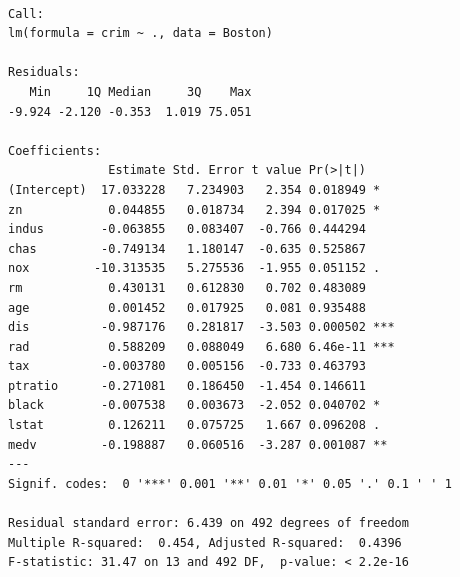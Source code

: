 \documentclass[
]{article}
\newenvironment{Shaded}{\begin{snugshade}}{\end{snugshade}}
\newcommand{\AttributeTok}[1]{\textcolor[rgb]{0.40,0.45,0.13}{#1}}
\newcommand{\DecValTok}[1]{\textcolor[rgb]{0.68,0.00,0.00}{#1}}
\newcommand{\FloatTok}[1]{\textcolor[rgb]{0.68,0.00,0.00}{#1}}
\newcommand{\FunctionTok}[1]{\textcolor[rgb]{0.28,0.35,0.67}{#1}}
\newcommand{\NormalTok}[1]{\textcolor[rgb]{0.00,0.23,0.31}{#1}}
\newcommand{\OtherTok}[1]{\textcolor[rgb]{0.00,0.23,0.31}{#1}}
\newcommand{\SpecialCharTok}[1]{\textcolor[rgb]{0.37,0.37,0.37}{#1}}
\newcommand{\StringTok}[1]{\textcolor[rgb]{0.13,0.47,0.30}{#1}}
\begin{document}
\begin{verbatim}

Call:
lm(formula = crim ~ ., data = Boston)

Residuals:
   Min     1Q Median     3Q    Max 
-9.924 -2.120 -0.353  1.019 75.051 

Coefficients:
              Estimate Std. Error t value Pr(>|t|)    
(Intercept)  17.033228   7.234903   2.354 0.018949 *  
zn            0.044855   0.018734   2.394 0.017025 *  
indus        -0.063855   0.083407  -0.766 0.444294    
chas         -0.749134   1.180147  -0.635 0.525867    
nox         -10.313535   5.275536  -1.955 0.051152 .  
rm            0.430131   0.612830   0.702 0.483089    
age           0.001452   0.017925   0.081 0.935488    
dis          -0.987176   0.281817  -3.503 0.000502 ***
rad           0.588209   0.088049   6.680 6.46e-11 ***
tax          -0.003780   0.005156  -0.733 0.463793    
ptratio      -0.271081   0.186450  -1.454 0.146611    
black        -0.007538   0.003673  -2.052 0.040702 *  
lstat         0.126211   0.075725   1.667 0.096208 .  
medv         -0.198887   0.060516  -3.287 0.001087 ** 
---
Signif. codes:  0 '***' 0.001 '**' 0.01 '*' 0.05 '.' 0.1 ' ' 1

Residual standard error: 6.439 on 492 degrees of freedom
Multiple R-squared:  0.454, Adjusted R-squared:  0.4396 
F-statistic: 31.47 on 13 and 492 DF,  p-value: < 2.2e-16
\end{verbatim}

\begin{Shaded}
\end{Shaded}
\end{document}
